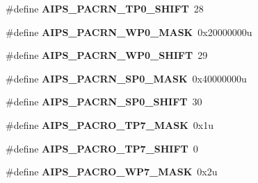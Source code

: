 \begin{DoxyCompactItemize}
\item 
\#define {\bfseries A\+I\+P\+S\+\_\+\+P\+A\+C\+R\+N\+\_\+\+T\+P0\+\_\+\+S\+H\+I\+FT}~28\hypertarget{group__AIPS__Register__Masks_gaca5165b8816e465b136db3c0cec9c8dd}{}\label{group__AIPS__Register__Masks_gaca5165b8816e465b136db3c0cec9c8dd}

\item 
\#define {\bfseries A\+I\+P\+S\+\_\+\+P\+A\+C\+R\+N\+\_\+\+W\+P0\+\_\+\+M\+A\+SK}~0x20000000u\hypertarget{group__AIPS__Register__Masks_gaf3c361cda4815ea73ef80bfe50d0f30a}{}\label{group__AIPS__Register__Masks_gaf3c361cda4815ea73ef80bfe50d0f30a}

\item 
\#define {\bfseries A\+I\+P\+S\+\_\+\+P\+A\+C\+R\+N\+\_\+\+W\+P0\+\_\+\+S\+H\+I\+FT}~29\hypertarget{group__AIPS__Register__Masks_ga38fa165b25262b49b3be41ab2d5fc5d5}{}\label{group__AIPS__Register__Masks_ga38fa165b25262b49b3be41ab2d5fc5d5}

\item 
\#define {\bfseries A\+I\+P\+S\+\_\+\+P\+A\+C\+R\+N\+\_\+\+S\+P0\+\_\+\+M\+A\+SK}~0x40000000u\hypertarget{group__AIPS__Register__Masks_ga76f688ae6b2df7fdaaa93fc06eed26b6}{}\label{group__AIPS__Register__Masks_ga76f688ae6b2df7fdaaa93fc06eed26b6}

\item 
\#define {\bfseries A\+I\+P\+S\+\_\+\+P\+A\+C\+R\+N\+\_\+\+S\+P0\+\_\+\+S\+H\+I\+FT}~30\hypertarget{group__AIPS__Register__Masks_gaf2360431fcaf89041736329326fdc97a}{}\label{group__AIPS__Register__Masks_gaf2360431fcaf89041736329326fdc97a}

\item 
\#define {\bfseries A\+I\+P\+S\+\_\+\+P\+A\+C\+R\+O\+\_\+\+T\+P7\+\_\+\+M\+A\+SK}~0x1u\hypertarget{group__AIPS__Register__Masks_ga6ed27808ffde1c176ac8af849f0e77c2}{}\label{group__AIPS__Register__Masks_ga6ed27808ffde1c176ac8af849f0e77c2}

\item 
\#define {\bfseries A\+I\+P\+S\+\_\+\+P\+A\+C\+R\+O\+\_\+\+T\+P7\+\_\+\+S\+H\+I\+FT}~0\hypertarget{group__AIPS__Register__Masks_gafb00e6dfdae9ad5ff353e7c124b4368f}{}\label{group__AIPS__Register__Masks_gafb00e6dfdae9ad5ff353e7c124b4368f}

\item 
\#define {\bfseries A\+I\+P\+S\+\_\+\+P\+A\+C\+R\+O\+\_\+\+W\+P7\+\_\+\+M\+A\+SK}~0x2u\hypertarget{group__AIPS__Register__Masks_gad48f775abbe6de940785427239a3af79}{}\label{group__AIPS__Register__Masks_gad48f775abbe6de940785427239a3af79}


\end{DoxyCompactItemize}
